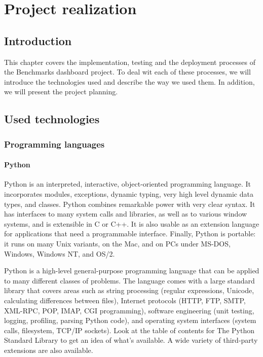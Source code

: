 \chapter{Project realization}
\section{Introduction}
This chapter covers the implementation, testing and the deployment processes of
the Benchmarks dashboard project. To deal wit each of these processes, we will
introduce the technologies used and describe the way we used them. In
addition, we will present the project planning.
\pagebreak

\section{Used technologies}
\subsection{Programming languages}
\subsubsection{Python}
Python is an interpreted, interactive, object-oriented programming language. It
incorporates modules, exceptions, dynamic typing, very high level dynamic data
types, and classes. Python combines remarkable power with very clear syntax. It
has interfaces to many system calls and libraries, as well as to various window
systems, and is extensible in C or C++. It is also usable as an extension
language for applications that need a programmable interface. Finally, Python is
portable: it runs on many Unix variants, on the Mac, and on PCs under MS-DOS,
Windows, Windows NT, and OS/2.

Python is a high-level general-purpose programming language that can be applied
to many different classes of problems. The language comes with a large standard
library that covers areas such as string processing (regular expressions,
Unicode, calculating differences between files), Internet protocols (HTTP, FTP,
SMTP, XML-RPC, POP, IMAP, CGI programming), software engineering (unit testing,
logging, profiling, parsing Python code), and operating system interfaces
(system calls, filesystem, TCP/IP sockets). Look at the table of contents for
The Python Standard Library to get an idea of what's available. A wide variety
of third-party extensions are also available.\cite{python}


